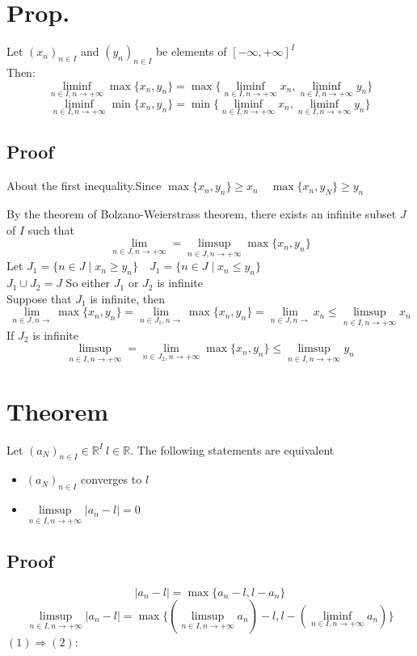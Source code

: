 \documentclass{book}
\begin{document}
\section{Prop.}
Let $(x_n)_{n\in I}$ and $(y_n)_{n\in I}$ be elements of $[-\infty,+\infty]^I$ \\
Then:
$$\liminf\limits_{n\in I,n\rightarrow+\infty}\max\{x_n,y_n\}=\max\{\liminf\limits_{n\in I,n\rightarrow+\infty}x_n,\liminf\limits_{n\in I,n\rightarrow+\infty}y_n\}$$
$$\liminf\limits_{n\in I,n\rightarrow+\infty}\min\{x_n,y_n\}=\min\{\liminf\limits_{n\in I,n\rightarrow+\infty}x_n,\liminf\limits_{n\in I,n\rightarrow+\infty}y_n\}$$
\subsection{Proof}
About the first inequality.Since $\max\{x_n,y_n\}\geq x_n\quad \max\{x_n,y_N\}\geq y_n$

By the theorem of Bolzano-Weierstrass theorem, there exists an infinite subset $J$ of $I$ such that$$\lim\limits_{n\in J,n\rightarrow+\infty}=\limsup\limits_{n\in J,n\rightarrow+\infty}\max\{x_n,y_n\}$$
Let $J_1=\{n\in J\mid x_n\geq y_n\}\quad J_1=\{n\in J\mid x_n\leq y_n\}$\\
$J_1\cup J_2=J$ So either $J_1$ or $J_2$ is infinite\\
Suppose that $J_1$ is infinite, then
$$\lim\limits_{n\in J,n\rightarrow}\max\{x_n,y_n\}=\lim\limits_{n\in J_1,n\rightarrow}\max\{x_n,y_n\}=\lim\limits_{n\in J,n\rightarrow}x_n\leq\limsup\limits_{n\in I,n\rightarrow+\infty}x_n$$
If $J_2$ is infinite
$$\limsup\limits_{n\in I,n\rightarrow+\infty}=\lim\limits_{n\in J_2,n\rightarrow+\infty}\max\{x_n,y_n\}\leq\limsup\limits_{n\in I,n\rightarrow+\infty}y_n$$
\section{Theorem}
Let $(a_N)_{n\in I}\in \mathbb{R} ^I\ l\in\mathbb{R} $. The following statements are equivalent
\begin{itemize}
    \item $(a_N)_{n\in I}$ converges to $l$
    \item $\limsup\limits_{n\in I,n\rightarrow+\infty}\lvert a_n-l\rvert=0$
\end{itemize}
\subsection{Proof}
$$\lvert a_n-l\rvert=\max\{a_n-l,l-a_n\}$$
$$\limsup\limits_{n\in I,n\rightarrow+\infty}\lvert a_n-l\rvert=\max\{(\limsup\limits_{n\in I,n\rightarrow+\infty}a_n)-l,l-(\liminf\limits_{n\in I,n\rightarrow+\infty}a_n)\}$$
$(1)\Rightarrow(2)$:
\end{document}
